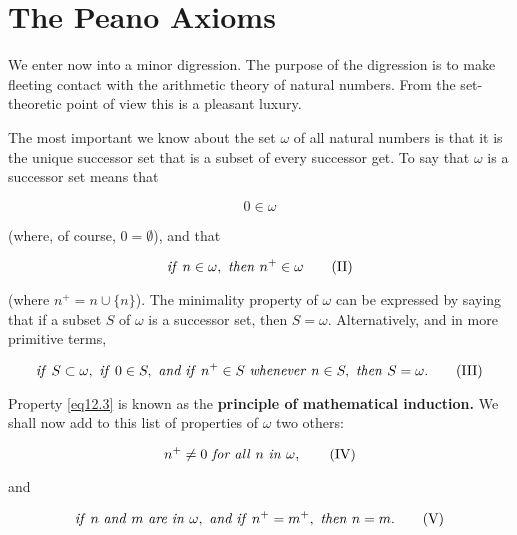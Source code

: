 
\chapter{The Peano Axioms}

We enter now into a minor digression. The purpose of the digression is to make fleeting contact with the arithmetic theory of natural numbers. From the set-theoretic point of view this is a pleasant luxury. 

The most important we know about the set $\omega$ of all natural numbers is that it is the unique successor set that is a subset of every successor get. To say that $\omega$ is a successor set means that

\begin{equation}
\label{eq12.1}
0 \in \omega \tag{I}
\end{equation}

(where, of course, $0 = \emptyset$), and that 

\begin{equation}
\label{eq12.2}
\text{\textit{if} } n \in\omega, \text{ \textit{then} } n^{+} \in \omega \tag{II}
\end{equation}

(where $n^{+} = n \cup \{ n \}$). The minimality property of $\omega$ can be expressed by saying that if a subset $S$ of $\omega$ is a successor set, then $S = \omega$. Alternatively, and in more primitive terms,

\begin{equation}
\label{eq12.3}
\text{\textit{if} } S \subset \omega, \text{ \textit{if} } 0 \in S, \text{ \textit{and if} } n^{+} \in S \text{ \textit{whenever} } n \in S, \text{ \textit{then} } S = \omega . \tag{III}
\end{equation}

Property \eqref{eq12.3} is known as the \textbf{principle of mathematical induction.} We shall now add to this list of properties of $\omega$ two others: 

\begin{equation}
\label{eq12.4}
n^{+} \neq 0 \text{ \textit{for all} } n \text{ \textit{in} } \omega , \tag{IV}
\end{equation}

and

\begin{equation}
\label{eq12.5}
\text{\textit{if} } n \text{ \textit{and} } m \text{ \textit{are in} } \omega , \text{ \textit{and if} } n^{+} = m^{+} , \text{ \textit{then} } n = m.\tag{V}
\end{equation}

